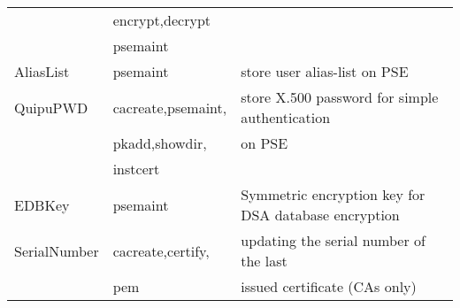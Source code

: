 {\begin{tabular}{|l|l|l|}
             & encrypt,decrypt     &                                                     \\
             & psemaint            &                                                     \\
AliasList    & psemaint            & store user alias-list on PSE                        \\
QuipuPWD     & cacreate,psemaint,  & store X.500 password for simple authentication      \\
             & pkadd,showdir,      & on PSE                                              \\
             & instcert            &                                                     \\
EDBKey       & psemaint            & Symmetric encryption key for DSA database encryption \\
SerialNumber & cacreate,certify,   & updating the serial number of the last              \\
             & pem                 & issued certificate (CAs only)                       \\ \hline
\end{tabular}
}

